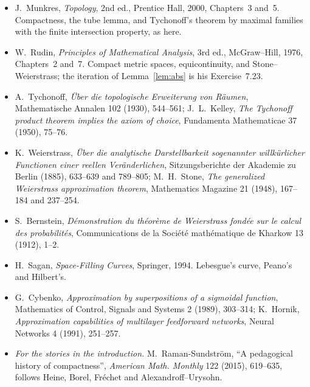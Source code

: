 \begin{itemize}
\item J.~Munkres, \emph{Topology}, 2nd ed., Prentice Hall, 2000, Chapters~3 and~5. Compactness, the tube lemma, and Tychonoff's
theorem by maximal families with the finite intersection property, as here.
\item W.~Rudin, \emph{Principles of Mathematical Analysis}, 3rd ed., McGraw--Hill, 1976, Chapters~2 and~7. Compact metric spaces,
equicontinuity, and Stone--Weierstrass; the iteration of Lemma~\ref{lem:abs} is his Exercise~7.23.
\item A.~Tychonoff, \emph{\"Uber die topologische Erweiterung von R\"aumen}, Mathematische Annalen 102 (1930), 544--561; J.~L.~Kelley,
\emph{The Tychonoff product theorem implies the axiom of choice}, Fundamenta Mathematicae 37 (1950), 75--76.
\item K.~Weierstrass, \emph{\"Uber die analytische Darstellbarkeit sogenannter willk\"urlicher Functionen einer reellen Ver\"anderlichen},
Sitzungsberichte der Akademie zu Berlin (1885), 633--639 and 789--805; M.~H.~Stone, \emph{The generalized Weierstrass approximation
theorem}, Mathematics Magazine 21 (1948), 167--184 and 237--254.
\item S.~Bernstein, \emph{D\'emonstration du th\'eor\`eme de Weierstrass fond\'ee sur le calcul des probabilit\'es}, Communications de la
Soci\'et\'e math\'ematique de Kharkow 13 (1912), 1--2.
\item H.~Sagan, \emph{Space-Filling Curves}, Springer, 1994. Lebesgue's curve, Peano's and Hilbert's.
\item G.~Cybenko, \emph{Approximation by superpositions of a sigmoidal function}, Mathematics of Control, Signals and Systems 2 (1989),
303--314; K.~Hornik, \emph{Approximation capabilities of multilayer feedforward networks}, Neural Networks 4 (1991), 251--257.
\item \emph{For the stories in the introduction.} M.~Raman-Sundstr\"om, ``A pedagogical history of compactness'', \emph{American Math. Monthly} 122 (2015), 619--635, follows
Heine, Borel, Fr\'echet and Alexandroff--Urysohn.
\end{itemize}
